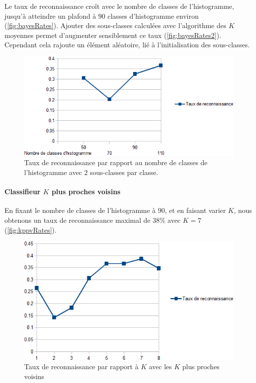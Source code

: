 Le taux de reconnaissance croît avec le nombre de classes de l'histogramme, jusqu'à atteindre un plafond à $90$ classes d'histogramme environ (\autoref{fig:bayesRates}). Ajouter des sous-classes calculées avec l'algorithme des $K$ moyennes permet d'augmenter sensiblement ce taux (\autoref{fig:bayesRates2}). Cependant cela rajoute un élément aléatoire, lié à l'initialisation des sous-classes.

\begin{figure}[htb!]
\centerline{\includegraphics[scale=0.8]{bayesRates2.png}}
\caption{Taux de reconnaissance par rapport au nombre de classes de l'histogramme avec $2$ sous-classes par classe.}
\label{fig:bayesRates2}
\end{figure}

\paragraph{Classifieur $K$ plus proches voisins}
En fixant le nombre de classes de l'histogramme à $90$, et en faisant varier $K$, nous obtenons un taux de reconnaissance maximal de $38$\% avec $K = 7$ (\autoref{fig:kppvRates}).

\begin{figure}[htb!]
\centerline{\includegraphics[scale=0.8]{kppvRates.png}}
\caption{Taux de reconnaissance par rapport à $K$ avec les $K$ plus proches voisins}
\label{fig:kppvRates}
\end{figure}

